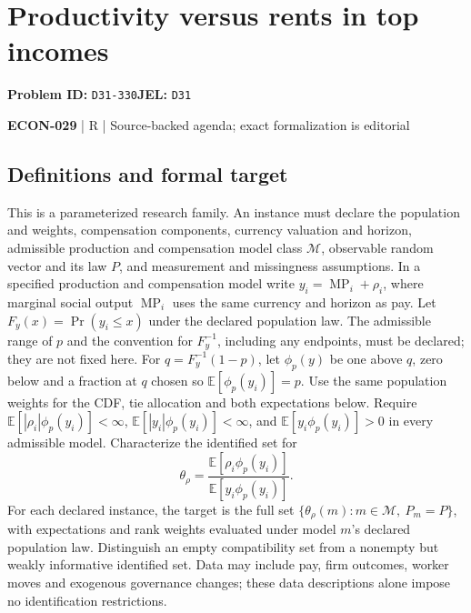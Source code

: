 \documentclass[11pt,a4paper]{article}
\begin{document}
\section*{Productivity versus rents in top incomes}
\textbf{Problem ID:} \texttt{D31-330}\quad \textbf{JEL:} \texttt{D31}\par
\label{problem:OP-0608}


\label{audited:ECON-029}

{\sffamily\small\color{muted}\textbf{ECON-029} | R | Source-backed agenda; exact formalization is editorial\par}

\subsection*{Definitions and formal target}

This is a parameterized research family. An instance must declare the population and weights, compensation components, currency valuation and horizon, admissible production and compensation model class \(\mathcal M\), observable random vector and its law \(P\), and measurement and missingness assumptions. In a specified production and compensation model write \(y_i=\operatorname{MP}_i+\rho_i\), where marginal social output \(\operatorname{MP}_i\) uses the same currency and horizon as pay. Let \(F_y(x)=\Pr(y_i\leq x)\) under the declared population law. The admissible range of \(p\) and the convention for \(F_y^{-1}\), including any endpoints, must be declared; they are not fixed here. For \(q=F_y^{-1}(1-p)\), let \(\phi_p(y)\) be one above \(q\), zero below and a fraction at \(q\) chosen so \(\mathbb E[\phi_p(y_i)]=p\). Use the same population weights for the CDF, tie allocation and both expectations below. Require \(\mathbb E[|\rho_i|\phi_p(y_i)]<\infty\), \(\mathbb E[|y_i|\phi_p(y_i)]<\infty\), and \(\mathbb E[y_i\phi_p(y_i)]>0\) in every admissible model. Characterize the identified set for
\[
 \theta_\rho=\frac{\mathbb E[\rho_i\phi_p(y_i)]}
                   {\mathbb E[y_i\phi_p(y_i)]}.
\]
For each declared instance, the target is the full set \(\{\theta_\rho(m):m\in\mathcal M,\ P_m=P\}\), with expectations and rank weights evaluated under model \(m\)'s declared population law. Distinguish an empty compatibility set from a nonempty but weakly informative identified set. Data may include pay, firm outcomes, worker moves and exogenous governance changes; these data descriptions alone impose no identification restrictions.
\end{document}
